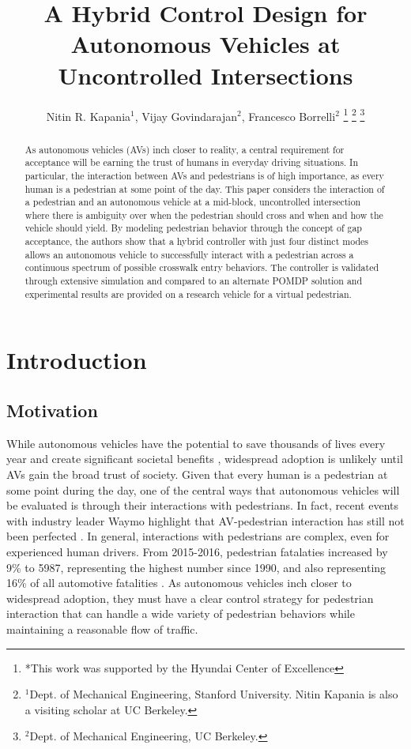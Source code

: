 \documentclass[letterpaper, 10 pt, conference]{ieeeconf}  %
\title{\LARGE \bf
A Hybrid Control Design for Autonomous Vehicles at Uncontrolled Intersections}
\author{Nitin R. Kapania$^{1}$, Vijay Govindarajan$^{2}$, Francesco Borrelli$^{2}$%
\thanks{*This work was supported by the Hyundai Center of Excellence}%
\thanks{$^{1}$Dept. of Mechanical Engineering, Stanford University. Nitin Kapania is also a visiting scholar at UC Berkeley.}%
\thanks{$^{2}$Dept. of Mechanical Engineering, UC Berkeley.}%
}
\begin{document}
\maketitle
\thispagestyle{empty}
\pagestyle{empty}


\begin{abstract}

As autonomous vehicles (AVs) inch closer to reality, a central requirement for acceptance will be earning the trust of humans in everyday driving situations. In particular, the interaction between AVs and pedestrians is of
high importance, as every human is a pedestrian at some point of the day. This paper considers the interaction of a pedestrian and an autonomous vehicle at a mid-block, uncontrolled intersection where there is ambiguity
over when the pedestrian should cross and when and how the vehicle should yield. By modeling pedestrian behavior through the concept of gap acceptance, the authors show that a hybrid controller with just four distinct modes allows an autonomous vehicle to successfully interact with a pedestrian across a continuous spectrum of possible crosswalk entry behaviors. The controller is validated through extensive simulation and compared to an alternate POMDP solution and experimental results are provided on a research vehicle for a virtual pedestrian.  

\end{abstract}


\section{Introduction}

\subsection{Motivation}

While autonomous vehicles have the potential to save thousands of lives every year and create significant societal benefits \cite{Fagnant2015}, widespread adoption is unlikely until AVs gain the broad trust of society. Given that every human is a pedestrian at some point during the day, one of the central ways that autonomous vehicles will be evaluated is through their interactions with pedestrians. In fact, recent events with industry leader Waymo highlight that AV-pedestrian interaction has still not been perfected \cite{MattRichtelandConorDougherty2015}. In general, interactions with pedestrians are complex, even for experienced human drivers. From 2015-2016, pedestrian fatalaties increased by 9\% to 5987, representing the highest number since 1990, and also representing 16\% of all automotive fatalities \cite{HighwayTrafficSafetyAdministration2016}. As autonomous vehicles inch closer to widespread adoption, they must have a clear control strategy for pedestrian interaction that can handle a wide variety of pedestrian behaviors while maintaining a reasonable flow of traffic.    
\end{document}
